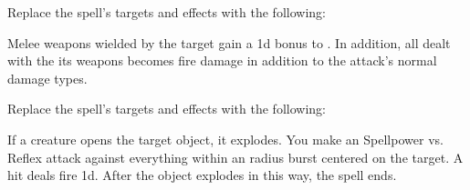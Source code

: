 


Replace the spell's targets and effects with the following:
\begin{spellcontent}

\begin{augmenttargetinginfo}



\end{augmenttargetinginfo}


\begin{augmenteffects}



\spelleffect
Melee weapons wielded by the target gain a \plus1d bonus to .
In addition, all  dealt with the its weapons becomes fire damage in addition to the attack's normal damage types.








\end{augmenteffects}

\end{spellcontent}








Replace the spell's targets and effects with the following:
\begin{spellcontent}

\begin{augmenttargetinginfo}




\end{augmenttargetinginfo}


\begin{augmenteffects}



\spelleffect
If a creature opens the target object, it explodes.
You make an Spellpower vs. Reflex attack against everything within an \areamed radius burst centered on the target.
A hit deals fire  \minus1d.
After the object explodes in this way, the spell ends.








\end{augmenteffects}

\end{spellcontent}





